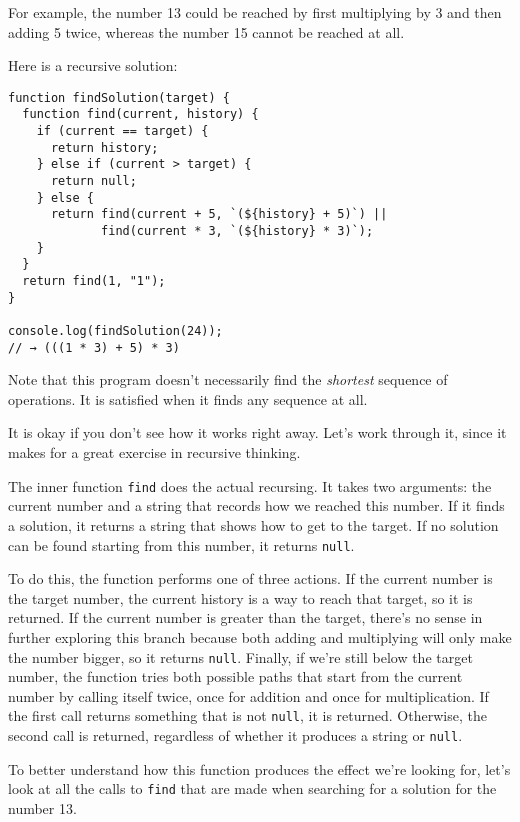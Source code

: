 For example, the number 13 could be reached by first multiplying by 3 and then adding 5 twice, whereas the number 15 cannot be reached at all.

Here is a recursive solution:

\begin{lstlisting}
function findSolution(target) {
  function find(current, history) {
    if (current == target) {
      return history;
    } else if (current > target) {
      return null;
    } else {
      return find(current + 5, `(${history} + 5)`) ||
             find(current * 3, `(${history} * 3)`);
    }
  }
  return find(1, "1");
}

console.log(findSolution(24));
// → (((1 * 3) + 5) * 3)
\end{lstlisting}
\noindent

Note that this program doesn't necessarily find the \emph{shortest} sequence of operations. It is satisfied when it finds any sequence at all.

It is okay if you don't see how it works right away. Let's work through it, since it makes for a great exercise in recursive thinking.

The inner function \lstinline`find` does the actual recursing. It takes two arguments: the current number and a string that records how we reached this number. If it finds a solution, it returns a string that shows how to get to the target. If no solution can be found starting from this number, it returns \lstinline`null`.

To do this, the function performs one of three actions. If the current number is the target number, the current history is a way to reach that target, so it is returned. If the current number is greater than the target, there's no sense in further exploring this branch because both adding and multiplying will only make the number bigger, so it returns \lstinline`null`. Finally, if we're still below the target number, the function tries both possible paths that start from the current number by calling itself twice, once for addition and once for multiplication. If the first call returns something that is not \lstinline`null`, it is returned. Otherwise, the second call is returned, regardless of whether it produces a string or \lstinline`null`.

To better understand how this function produces the effect we're looking for, let's look at all the calls to \lstinline`find` that are made when searching for a solution for the number 13.

